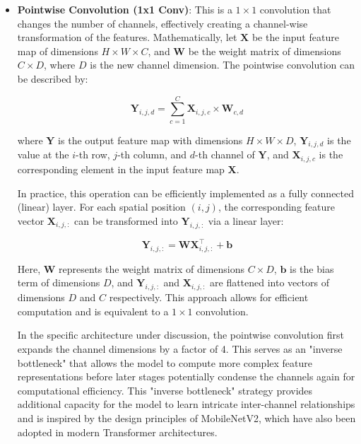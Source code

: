 \documentclass[a4paper,12pt,openright]{book}
\begin{document}
\begin{itemize}
    \item \textbf{Pointwise Convolution (1x1 Conv)}: This is a \(1 \times 1\) convolution that changes the number of channels, effectively creating a channel-wise transformation of the features. Mathematically, let \( \mathbf{X} \) be the input feature map of dimensions \( H \times W \times C \), and \( \mathbf{W} \) be the weight matrix of dimensions \( C \times D \), where \( D \) is the new channel dimension. The pointwise convolution can be described by:

        \[
        \mathbf{Y}_{i,j,d} = \sum_{c=1}^{C} \mathbf{X}_{i,j,c} \times \mathbf{W}_{c,d}
        \]
        
        where \( \mathbf{Y} \) is the output feature map with dimensions \( H \times W \times D \), \( \mathbf{Y}_{i,j,d} \) is the value at the \(i\)-th row, \(j\)-th column, and \(d\)-th channel of \( \mathbf{Y} \), and \( \mathbf{X}_{i,j,c} \) is the corresponding element in the input feature map \( \mathbf{X} \).

        In practice, this operation can be efficiently implemented as a fully connected (linear) layer. For each spatial position \( (i, j) \), the corresponding feature vector \( \mathbf{X}_{i,j,:} \) can be transformed into \( \mathbf{Y}_{i,j,:} \) via a linear layer:

        \[
        \mathbf{Y}_{i,j,:} = \mathbf{W} \mathbf{X}_{i,j,:}^{\top} + \mathbf{b}
        \]
        
        Here, \( \mathbf{W} \) represents the weight matrix of dimensions \( C \times D \), \( \mathbf{b} \) is the bias term of dimensions \( D \), and \( \mathbf{Y}_{i,j,:} \) and \( \mathbf{X}_{i,j,:} \) are flattened into vectors of dimensions \( D \) and \( C \) respectively. This approach allows for efficient computation and is equivalent to a \( 1 \times 1 \) convolution.

       In the specific architecture under discussion, the pointwise convolution first expands the channel dimensions by a factor of 4. This serves as an "inverse bottleneck" that allows the model to compute more complex feature representations before later stages potentially condense the channels again for computational efficiency. This "inverse bottleneck" strategy provides additional capacity for the model to learn intricate inter-channel relationships and is inspired by the design principles of MobileNetV2\cite{DBLP:journals/corr/abs-1801-04381}, which have also been adopted in modern Transformer architectures.


\end{itemize}
\end{document}
